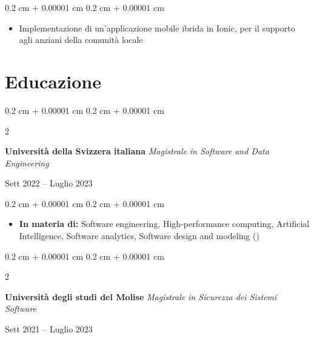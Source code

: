 \documentclass[10pt, letterpaper]{article}
\newenvironment{highlights}{
    \begin{itemize}[
        topsep=0.10 cm,
        parsep=0.10 cm,
        partopsep=0pt,
        itemsep=0pt,
        leftmargin=0.4 cm + 10pt
    ]
}{
    \end{itemize}
} %
\newenvironment{onecolentry}{
    \begin{adjustwidth}{
        0.2 cm + 0.00001 cm
    }{
        0.2 cm + 0.00001 cm
    }
}{
    \end{adjustwidth}
} %
\newenvironment{twocolentry}[2][]{
    \onecolentry
    \def\secondColumn{#2}
    \setcolumnwidth{\fill, 4.5 cm}
    \begin{paracol}{2}
}{
    \switchcolumn \raggedleft \secondColumn
    \end{paracol}
    \endonecolentry
} %
\let\hrefWithoutArrow\href
\renewcommand{\href}[2]{\hrefWithoutArrow{#1}{\ifthenelse{\equal{#2}{}}{ }{#2 }\raisebox{.15ex}{\footnotesize \faExternalLink*}}}
\begin{document}
        \vspace{0.10 cm}
        \begin{onecolentry}
            \begin{highlights}
                \item Implementazione di un'applicazione mobile ibrida in Ionic, per il supporto agli anziani della comunità locale
            \end{highlights}
        \end{onecolentry}



       
    \section{Educazione}   
        \begin{twocolentry}{
                 
        Sett 2022 – Luglio 2023}
            \textbf{Università della Svizzera italiana} \textit{Magistrale in Software and Data Engineering}
        \end{twocolentry}

        \vspace{0.10 cm}
        \begin{onecolentry}
            \begin{highlights}
                \item \textbf{In materia di:} Software engineering, High-performance computing, Artificial Intelligence, Software analytics, Software design and modeling (\href{https://www.usi.ch/en/education/master/software-and-data-engineering}{MSDE})
            \end{highlights}
        \end{onecolentry}
        \vspace{0.2 cm}

        \begin{twocolentry}{
                 
        Sett 2021 – Luglio 2023}
            \textbf{Università degli studi del Molise} \textit{Magistrale in Sicurezza dei Sistemi Software}
        \end{twocolentry}
\end{document}
